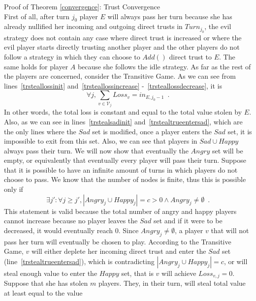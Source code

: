 \begin{sepproof}{Proof of Theorem \ref{convergence}: Trust Convergence} \ \\
\label{convergenceproof}
  First of all, after turn $j_0$ player $E$ will always pass her turn
  because she has already nullified her incoming and outgoing direct trusts in $Turn_{j_0}$, the evil strategy does not
  contain any case where direct trust is increased or where the evil player starts directly trusting another player and
  the other players do not follow a strategy in which they can choose to $Add\left(\right)$ direct trust to $E$. The same
  holds for player $A$ because she follows the idle strategy. As far as the rest of the players are concerned, consider the
  Transitive Game. As we can see from lines~\ref{trsteallossinit} and~\ref{trsteallossincrease}
  -~\ref{trsteallossdecrease}, it is
  \begin{equation*}
    \forall j, \sum\limits_{v \in \mathcal{V}_j}Loss_v = in_{E, j_0-1} \enspace.
  \end{equation*}
  In other words, the total loss is constant and equal to the total value stolen by $E$. Also, as we can see in
  lines~\ref{trstealsadinit} and~\ref{trstealtrueentersad}, which are the only lines where the $Sad$ set is modified,
  once a player enters the $Sad$ set, it is impossible to exit from this set. Also, we can see that players in $Sad
  \cup Happy$ always pass their turn. We will now show that eventually the $Angry$ set will be empty, or equivalently
  that eventually every player will pass their turn. Suppose that it is possible to have an infinite amount of turns
  in which players do not choose to pass. We know that the number of nodes is finite, thus this is possible only if
  \begin{equation*}
    \exists j': \forall j \geq j', |Angry_j \cup Happy_j| = c > 0 \wedge Angry_j \neq \emptyset \enspace.
  \end{equation*}
  This statement is valid because the total number of angry and happy players cannot increase because no player leaves
  the $Sad$ set and if it were to be decreased, it would eventually reach 0. Since $Angry_j \neq \emptyset$, a player
  $v$ that will not pass her turn will eventually be chosen to play. According to the Transitive Game, $v$ will either
  deplete her incoming direct trust and enter the $Sad$ set (line~\ref{trstealtrueentersad}), which is contradicting
  $|Angry_j \cup Happy_j| = c$, or will steal enough value to enter the $Happy$ set, that is $v$ will achieve $Loss_{v, j}
  = 0$. Suppose that she has stolen $m$ players. They, in their turn, will steal total value at least equal to the value

\end{sepproof}
